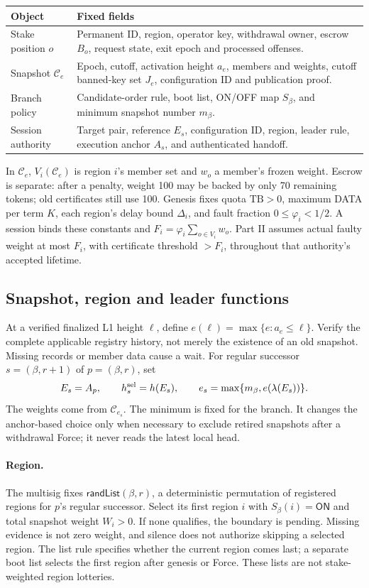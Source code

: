 \documentclass[11pt,a4paper]{article}
\newcommand{\tagg}[1]{\mathsf{#1}}
\newcommand{\cfg}{\mathcal C}
\begin{document}
\begin{tabularx}{\linewidth}{@{}>{\raggedright\arraybackslash}p{.22\linewidth}Y@{}}\toprule
Object & Fixed fields\\\midrule
Stake position $o$ & Permanent ID, region, operator key, withdrawal owner,
escrow $B_o$, request state, exit epoch and processed offenses.\\
Snapshot $\cfg_e$ & Epoch, cutoff, activation height $a_e$, members and
weights, cutoff banned-key set $J_e$, configuration ID and publication proof.\\
Branch policy & Candidate-order rule, boot list, ON/OFF map $S_\beta$,
and minimum snapshot number $m_\beta$.\\
Session authority & Target pair, reference $E_s$, configuration ID, region,
leader rule, execution anchor $A_s$, and authenticated handoff.\\\bottomrule
\end{tabularx}

In $\cfg_e$, $V_i(\cfg_e)$ is region $i$'s member set and $w_o$ a member's
frozen weight. Escrow is separate: after a penalty, weight 100 may be
backed by only 70 remaining tokens; old certificates still use 100.
Genesis fixes quota $\mathrm{TB}>0$, maximum DATA per term $K$, each
region's delay bound $\Delta_i$, and fault fraction $0\le\varphi_i<1/2$.
A session binds these constants and $F_i=\varphi_i\sum_{o\in V_i}w_o$.
Part II assumes actual faulty weight at most $F_i$, with certificate
threshold $>F_i$, throughout that authority's accepted lifetime.

\newpage
\subsection{Snapshot, region and leader functions}
At a verified finalized L1 height $\ell$, define
$e(\ell)=\max\{e:a_e\le\ell\}$. Verify the complete applicable registry
history, not merely the existence of an old snapshot. Missing records or
member data cause a wait. For regular successor $s=(\beta,r+1)$ of
$p=(\beta,r)$, set
\begin{equation}\label{eq:selection}
 E_s=A_p,\qquad h_s^{\rm sel}=h(E_s),\qquad
 e_s=\max\{m_\beta,e(\lambda(E_s))\}.
\end{equation}
The weights come from $\cfg_{e_s}$. The minimum is fixed for the branch.
It changes the anchor-based choice only when necessary to exclude retired
snapshots after a withdrawal Force; it never reads the latest local head.

\paragraph{Region.}
The multisig fixes $\tagg{randList}(\beta,r)$, a deterministic permutation
of registered regions for $p$'s regular successor. Select its first region
$i$ with $S_\beta(i)=\tagg{ON}$ and total snapshot weight $W_i>0$.
If none qualifies, the boundary is pending. Missing evidence is not zero
weight, and silence does not authorize skipping a selected region.
The list rule specifies whether the current region comes last; a separate
boot list selects the first region after genesis or Force. These lists
are not stake-weighted region lotteries.
\end{document}
